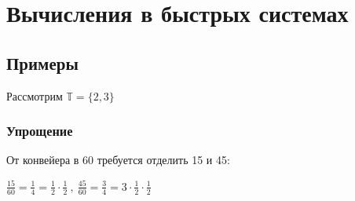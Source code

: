 \chapter{Вычисления в быстрых системах}

\section{Примеры}

\noindent Рассмотрим $\mathbb{T} = \{2, 3\}$






\subsection{Упрощение}

\noindent От конвейера в 60 требуется отделить 15 и 45:

\vspace{0.1in}

$\frac{15}{60} = \frac{1}{4} = \frac{1}{2}\cdot\frac{1}{2} \ , \ \frac{45}{60} = \frac{3}{4} = 3 \cdot \frac{1}{2}\cdot\frac{1}{2}$

\vspace{0.5in}




